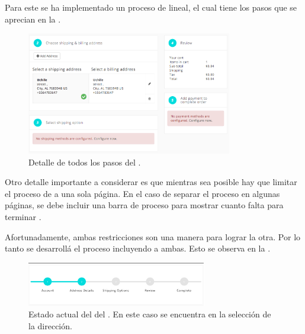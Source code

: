 	Para este \frameworkPC se ha implementado un proceso de \checkoutEF lineal, el cual tiene los pasos que se aprecian en la .


	\begin{figure}[!h]
		\centering
		\includegraphics[width=0.8\textwidth]{figuras/shipping/steps.png}
		\caption{Detalle de todos los pasos del \workflowCPT \shippingEF.}
		\label{figure:checkout:steps}
	\end{figure}

	Otro detalle importante a considerar es que mientras sea posible hay que limitar el proceso de \checkoutEF a una sola página. En el caso de separar el proceso en algunas páginas, se debe incluir una barra de proceso para mostrar cuanto falta para terminar \cite{online_official_imediaconnection_best_practices_shopping_cart}.

	Afortunadamente, ambas restricciones son una manera para lograr la otra. Por lo tanto se desarrollá el proceso incluyendo a ambas. Esto se observa en la .

	\begin{figure}[H]
		\centering
		\includegraphics[width=0.7\textwidth]{figuras/shipping/global_status.png}
		\caption{Estado actual del \workflowCPT del \shippingEF. En este caso se encuentra en la selección de la dirección.}
		\label{figure:checkout:global_status}
	\end{figure}

